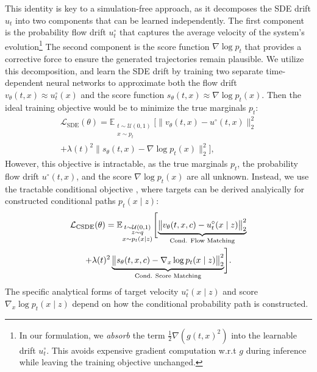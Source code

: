 \documentclass[twoside]{article}
\begin{document}
This identity is key to a simulation-free approach, as it decomposes the SDE drift \(u_t\) into two components that can be learned independently. The first component is the probability flow drift \(u_t^\circ\) that captures the average velocity of the system's evolution\footnote{In our formulation, we \textit{absorb} the term \(\tfrac{1}{2}\nabla(g(t,x)^2)\) into the learnable drift \(u_t^\circ\). This avoids expensive gradient computation w.r.t $g$ during inference while leaving the training objective unchanged.} The second component is the score function \(\nabla \log p_t\) that provides a corrective force to ensure the generated trajectories remain plausible. We utilize this decomposition, and learn the SDE drift by training two separate time-dependent neural networks to approximate both the flow drift \(v_\theta(t, x) \approx u_t^\circ(x)\) and the score function \(s_\theta(t, x) \approx \nabla \log p_t(x)\).
Then the ideal training objective would be to minimize the true marginals \(p_t\): 
\begin{multline}
\mathcal{L}_{\text{SDE}}(\theta) =
\mathbb{E}_{\substack{t \sim \mathcal{U}(0,1)\\ x \sim p_t}}
\big[ \|v_\theta(t, x) - u^\circ(t, x)\|_2^2  \\
+ \lambda(t)^2 \|s_\theta(t, x) - \nabla \log p_t(x)\|_2^2 \big],
\label{eq:flow_score_matching_loss}
\end{multline}
However, this objective is intractable, as the true marginals $p_t$, the probability flow drift $u^\circ(t, x)$, and the score $\nabla \log p_t(x)$ are all unknown.
Instead, we use the tractable conditional objective \citep{tong2023simulation,lipman2022flow}, where targets can be derived analyically for constructed conditional paths \(p_t(x \mid z)\):
\begin{multline}
\mathcal{L}_{\rm CSDE}(\theta)
 = \mathbb{E}_{\substack{t \sim \mathcal{U}(0,1)\\ z \sim q\\ x \sim p_t(x \mid z)}}
 \Biggl[
 \underbrace{\bigl\lVert v_\theta(t,x,c) - u^\circ_t(x \mid z) \bigr\rVert_2^2}_{\text{Cond. Flow Matching}}\\
 +\lambda(t)^2
 \underbrace{\bigl\lVert s_\theta(t,x,c) - \nabla_x \log p_t(x \mid z) \bigr\rVert_2^2}_{\text{Cond. Score Matching}}
 \Biggr].
\label{eq:IMMFM_objective_flow_score}
\end{multline}
The specific analytical forms of target velocity $u^\circ_t(x \mid z)$ and score $\nabla_x \log p_t(x \mid z)$ depend on how the conditional probability path is constructed.
\end{document}
